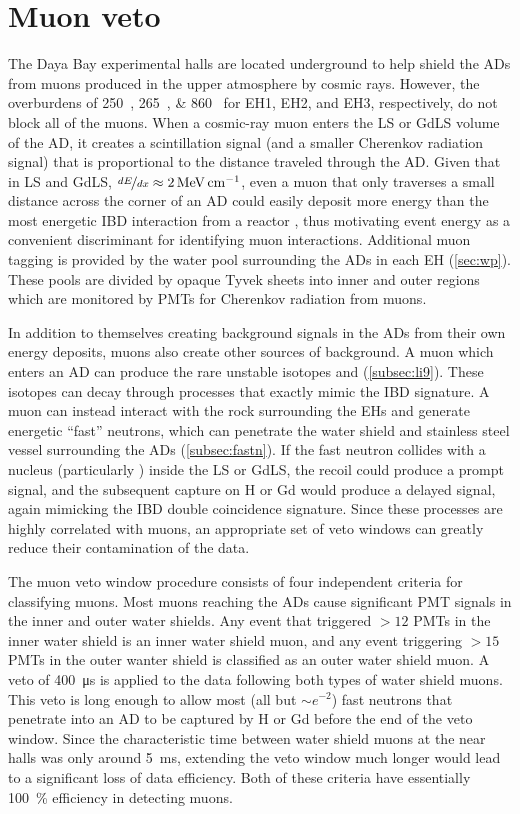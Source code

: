 \section{Muon veto}
\label{sec:muonveto}

The Daya Bay experimental halls are located underground
to help shield the ADs from muons produced in the upper atmosphere by cosmic rays.
However, the overburdens of \SIlist{250;265;860}{\mwe}
for EH1, EH2, and EH3, respectively, do not block all of the muons.
When a cosmic-ray muon enters the LS or GdLS volume of the AD,
it creates a scintillation signal (and a smaller Cherenkov radiation signal)
that is proportional to the distance traveled
through the AD.
Given that in LS and GdLS, $\nicefrac{dE}{dx} \approx \SI{2}{\mev\per\cm}$,
even a muon that only traverses a small distance across the corner of an AD could easily deposit
more energy than the most energetic IBD interaction from a reactor \nuebar,
thus motivating event energy as a convenient discriminant for identifying muon interactions.
Additional muon tagging is provided by the water pool
surrounding the ADs in each EH (\cref{sec:wp}).
These pools are divided by opaque Tyvek sheets into inner and outer regions
which are monitored by PMTs for Cherenkov radiation from muons.

In addition to themselves creating background signals in the ADs
from their own energy deposits,
muons also create other sources of background.
A muon which enters an AD can produce
the rare unstable isotopes \li and \he (\cref{subsec:li9}).
These isotopes can decay through processes that exactly mimic the IBD signature.
A muon can instead interact with the rock surrounding the EHs
and generate energetic ``fast'' neutrons,
which can penetrate the water shield and stainless steel vessel surrounding the ADs
(\cref{subsec:fastn}).
If the fast neutron collides with a nucleus (particularly )
inside the LS or GdLS,
the recoil could produce a prompt signal,
and the subsequent capture on H or Gd would produce
a delayed signal, again mimicking the IBD double coincidence signature.
Since these processes are highly correlated with muons,
an appropriate set of veto windows can greatly reduce their contamination of the data.

The muon veto window procedure consists of four independent criteria
for classifying muons.
Most muons reaching the ADs cause significant PMT signals in the inner and outer water shields.
Any event that triggered $>12$ PMTs in the inner water shield
is an inner water shield muon,
and any event triggering $>15$ PMTs in the outer wanter shield
is classified as an outer water shield muon.
A veto of \SI{400}{\micro\second} is applied to the data following
both types of water shield muons.
This veto is long enough to allow most (all but $\sim e^{-2}$)
fast neutrons that penetrate into an AD to be captured by H or Gd
before the end of the veto window.
Since the characteristic time between water shield muons at the near halls
was only around \SI{5}{\milli\second},
extending the veto window much longer would lead to a significant
loss of data efficiency.
Both of these criteria have essentially \SI{100}{\percent} efficiency
in detecting muons.

